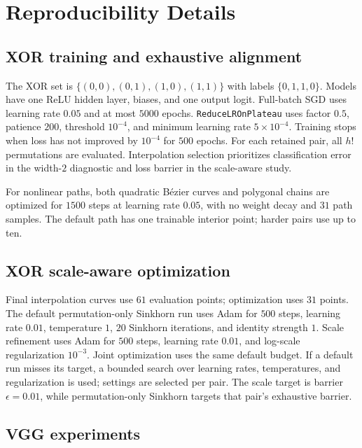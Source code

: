 \documentclass{article}
\begin{document}



\appendix

\section{Reproducibility Details}
\label{app:details}

\subsection{XOR training and exhaustive alignment}

The XOR set is $\{(0,0),(0,1),(1,0),(1,1)\}$ with labels
$\{0,1,1,0\}$.  Models have one ReLU hidden layer, biases, and one output logit.
Full-batch SGD uses learning rate $0.05$ and at most $5000$ epochs.
\texttt{ReduceLROnPlateau} uses factor $0.5$, patience $200$, threshold
$10^{-4}$, and minimum learning rate $5\times10^{-4}$.  Training stops when
loss has not improved by $10^{-4}$ for $500$ epochs.  For each retained pair,
all $h!$ permutations are evaluated.  Interpolation selection prioritizes
classification error in the width-$2$ diagnostic and loss barrier in the
scale-aware study.

For nonlinear paths, both quadratic B\'ezier curves and polygonal chains are
optimized for $1500$ steps at learning rate $0.05$, with no weight decay and
$31$ path samples.  The default path has one trainable interior point; harder
pairs use up to ten.

\subsection{XOR scale-aware optimization}

Final interpolation curves use $61$ evaluation points; optimization uses $31$
points.  The default permutation-only Sinkhorn run uses Adam for $500$ steps,
learning rate $0.01$, temperature $1$, $20$ Sinkhorn iterations, and identity
strength $1$.  Scale refinement uses Adam for $500$ steps, learning rate
$0.01$, and log-scale regularization $10^{-3}$.  Joint optimization uses the
same default budget.  If a default run misses its target, a bounded search over
learning rates, temperatures, and regularization is used; settings are selected
per pair.  The scale target is barrier $\epsilon=0.01$, while permutation-only
Sinkhorn targets that pair's exhaustive barrier.

\subsection{VGG experiments}
\end{document}
